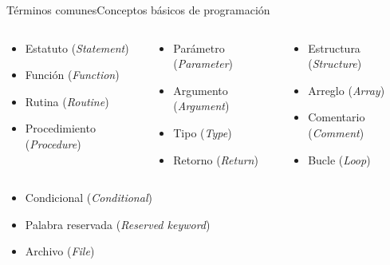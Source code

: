 \documentclass[spanish]{beamer}
\begin{document}
\begin{frame}{Términos comunes}{Conceptos básicos de programación}
    \begin{columns}
        \begin{column}{0.33\textwidth}
            \begin{itemize}
                \item Estatuto (\textit{Statement})
                \item Función (\textit{Function})
                \item Rutina (\textit{Routine})
                \item Procedimiento (\textit{Procedure})
            \end{itemize}
        \end{column}
        \begin{column}{0.33\textwidth}
            \begin{itemize}
                \item Parámetro (\textit{Parameter})
                \item Argumento (\textit{Argument})
                \item Tipo (\textit{Type})
                \item Retorno (\textit{Return})
            \end{itemize}
        \end{column}
        \begin{column}{0.3\textwidth}
            \begin{itemize}
                \item Estructura (\textit{Structure})
                \item Arreglo (\textit{Array})
                \item Comentario (\textit{Comment})
                \item Bucle (\textit{Loop})
            \end{itemize}
        \end{column}
    \end{columns}
    \begin{columns}
        \begin{column}{0.33\textwidth}
            \begin{itemize}
                \item Condicional (\textit{Conditional})
                \item Palabra reservada (\textit{Reserved keyword})
                \item Archivo (\textit{File})

\end{itemize}
\end{column}
\end{columns}
\end{frame}
\end{document}
